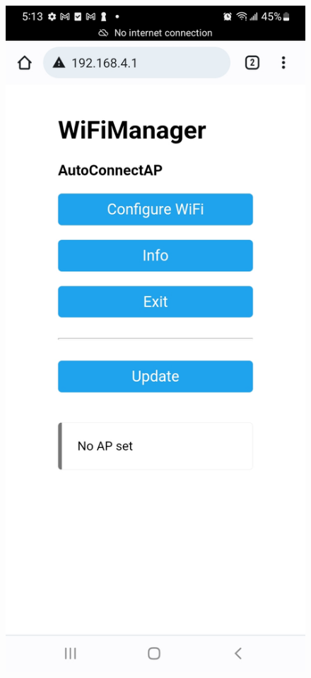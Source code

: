 \documentclass[oneside]{article}
\begin{document}
\begin{figure}[H]
\centering
\includegraphics[scale=.15]{images/wifi_selection1.jpg}

\end{figure}
\end{document}
